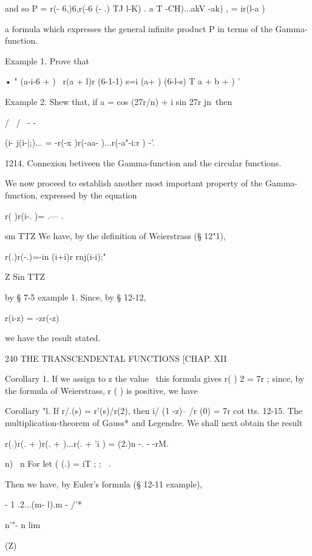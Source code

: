 and so P =  r(- 6,)6,r(-6   (- .)   TJ l-K) . 
a T -CH)...akV -ak)  , = ir(l-a ) 

a formula which expresses the general infinite product P in terms of the 
Gamma-function. 

Example 1. Prove that 

• "  (a-i-6 +  ) \ r(a + l)r (6-1-1) 
s=i (a+ ) (6-l-s) T a + b +  )  ' 

Example 2. Shew that, if a = cos (27r/n) + i sin  27r jn\ then 

/ \ / \ -   - 

 (i- j(i-|;)... =  -r(-x )r(-aa- )...r(-a"-i:r ) -'. 

1214. Connexion betiveen the Gamma-function and the circular functions. 

We now proceed to establish another most important property of the 
Gamma-function, expressed by the equation 

r( )r(i-. )= .— . 

sm TTZ 
We have, by the definition of Weierstrass (§ 12"1), 

r(.)r(-.)=-in (i+i)r rnj(i-i);" 



Z Sin TTZ 

by § 7-5 example 1. Since, by § 12-12, 

r(i-z) = -zr(-z) 

we have the result stated. 



240 THE TRANSCENDENTAL FUNCTIONS [CHAP. XII 

Corollary 1. If we assign to z the value \, this formula gives  r( ) 2 = 7r ; since, by 
the formula of Weierstrass, r ( ) is positive, we have 

Corollary "l. If r/.(s) = r'(s)/r(2), then i/  (1 -z)-- /r (0) = 7r cot tts. 
12-15. The multiplication-theorem of Gauss* and Legendre. 
We shall next obtain the result 

r(.)r(. +  )r(. +  )...r(. + 'i ) = (2.)n -. - -rM. 



n) \ n 
For let ( (.) =  iT ; ;  \ . 

Then we have, by Euler's formnla (§ 12-11 example), 

 - 1 .2...(m- l).m - /'* 



n'"-  n lim 



 (Z)  



